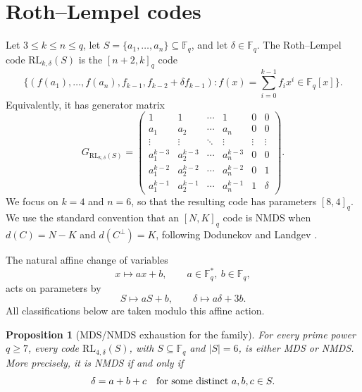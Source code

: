 \documentclass[11pt]{article}
\newcommand{\F}{\mathbb F}
\newcommand{\RL}{\mathrm{RL}}
\theoremstyle{plain}
\newtheorem{proposition}{Proposition}
\theoremstyle{definition}
\begin{document}
\section{Roth--Lempel codes}

Let \(3\leq k\leq n\leq q\), let \(S=\{a_1,\ldots,a_n\}\subseteq \F_q\), and
let \(\delta\in\F_q\).  The Roth--Lempel code
\(\RL_{k,\delta}(S)\) is the \([n+2,k]_q\) code
\[
  \bigl\{
    (f(a_1),\ldots,f(a_n),f_{k-1},f_{k-2}+\delta f_{k-1}):
    f(x)=\sum_{i=0}^{k-1} f_i x^i\in\F_q[x]
  \bigr\}.
\]
Equivalently, it has generator matrix
\[
  G_{\RL_{k,\delta}(S)}=
  \begin{pmatrix}
    1 & 1 & \cdots & 1 & 0 & 0\\
    a_1 & a_2 & \cdots & a_n & 0 & 0\\
    \vdots & \vdots & \ddots & \vdots & \vdots & \vdots\\
    a_1^{k-3} & a_2^{k-3} & \cdots & a_n^{k-3} & 0 & 0\\
    a_1^{k-2} & a_2^{k-2} & \cdots & a_n^{k-2} & 0 & 1\\
    a_1^{k-1} & a_2^{k-1} & \cdots & a_n^{k-1} & 1 & \delta
  \end{pmatrix}.
\]
We focus on \(k=4\) and \(n=6\), so that the resulting code has parameters
\([8,4]_q\).
We use the standard convention that an \([N,K]_q\) code is NMDS when
\(d(C)=N-K\) and \(d(C^\perp)=K\), following
Dodunekov and Landgev \cite{DodunekovLandgev1995}.

The natural affine change of variables
\[
  x\mapsto ax+b,\qquad a\in\F_q^\ast,\ b\in\F_q,
\]
acts on parameters by
\[
  S\mapsto aS+b,\qquad \delta\mapsto a\delta+3b.
\]
All classifications below are taken modulo this affine action.

\begin{proposition}[MDS/NMDS exhaustion for the family]\label{prop:exhaustion}
For every prime power \(q\ge7\), every code
\(\RL_{4,\delta}(S)\), with \(S\subseteq\F_q\) and \(|S|=6\), is either MDS
or NMDS.  More precisely, it is NMDS if and only if
\[
 \delta=a+b+c\quad\hbox{for some distinct }a,b,c\in S.
\]
\end{proposition}
\end{document}
